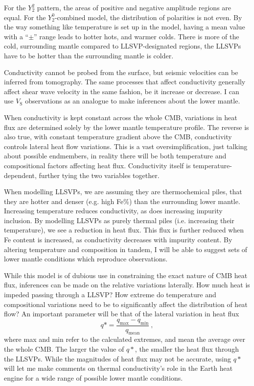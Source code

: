 For the $Y^{2}_{2}$ pattern, the areas of positive and negative amplitude regions are equal. For the  $Y^{0}_{2}$-combined model, the distribution of polarities is not even. By the way something like temperature is set up in the model, having a mean value with a ``$\pm$'' range leads to hotter hots, and warmer colds. There is more of the cold, surrounding mantle compared to LLSVP-designated regions, the LLSVPs have to be hotter than the surrounding mantle is colder.

Conductivity cannot be probed from the surface, but seismic velocities can be inferred from tomography. The same processes that affect conductivity generally affect shear wave velocity in the same fashion, be it increase or decrease. I can use $V_{\mathrm{S}}$ observations as an analogue to make inferences about the lower mantle.

When conductivity is kept constant across the whole CMB, variations in heat flux are determined solely by the lower mantle temperature profile. The reverse is also true, with constant temperature gradient above the CMB, conductivity controls lateral heat flow variations. This is a vast oversimplification, just talking about possible endmembers, in reality there will be both temperature and compositional factors affecting heat flux. Conductivity itself is temperature-dependent, further tying the two variables together.

When modelling LLSVPs, we are assuming they are thermochemical piles, that they are hotter and denser (e.g. high Fe\%) than the surrounding lower mantle. Increasing temperature reduces conductivity, as does increasing impurity inclusion. By modelling LLSVPs as purely thermal piles (i.e. increasing their temperature), we see a reduction in heat flux. This flux is further reduced when Fe content is increased, as conductivity decreases with impurity content. By altering temperature and composition in tandem, I will be able to suggest sets of lower mantle conditions which reproduce observations.

While this model is of dubious use in constraining the exact nature of CMB heat flux, inferences can be made on the relative variations laterally. How much heat is impeded passing through a LLSVP? How extreme do temperature and compositional variations need to be to significantly affect the distribution of heat flow? An important parameter will be that of the lateral variation in heat flux
%
\begin{equation}
\label{eq.q_star}
q* = \frac{q_{\mathrm{max}}-q_{\mathrm{min}}}{q_{\mathrm{mean}}}\ ,
\end{equation}
%
where max and min refer to the calculated extremes, and mean the average over the whole CMB. The larger the value of $q*$, the smaller the heat flux through the LLSVPs. While the magnitudes of heat flux may not be accurate, using $q*$ will let me make comments on thermal conductivity's role in the Earth heat engine for a wide range of possible lower mantle conditions.

